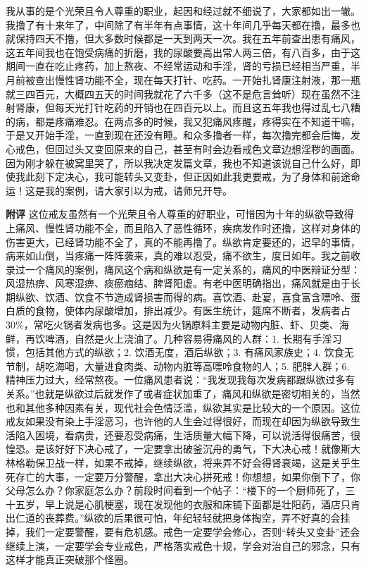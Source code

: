 \begin{case}
    我从事的是个光荣且令人尊重的职业，起因和经过就不细说了，大家都如出一辙。我撸了有十来年了，中间除了有半年有点事情，这十年间几乎每天都在撸，最多也就保持四天不撸，但大多数时候都是一天到两天一次。我在五年前查出患有痛风，这五年间我也在饱受病痛的折磨，我的尿酸要高出常人两三倍，有八百多，由于这期间一直在吃止疼药，加上熬夜、不经常运动和手淫，肾的亏损已经相当严重，半月前被查出慢性肾功能不全，现在每天打针、吃药。一开始扎肾康注射液，那一瓶就三四百元，大概四五天的时间我就花了六千多（这不是危言耸听）现在虽然不注射肾康，但每天光打针吃药的开销也在四百元以上。而且这五年我也得过乱七八糟的病，都是疼痛难忍。在两点多的时候，我又犯痛风疼醒，疼得实在不知道干嘛，于是又开始手淫，一直到现在还没有睡。和众多撸者一样，每次撸完都会后悔，发心戒色，但回过头又变回原来的自己，甚至有时会边看戒色文章边想淫秽的画面。因为刚才躲在被窝里哭了，所以我决定发篇文章，我也不知道该说自己什么好，即使我此刻下定决心，我可能转头又变卦，但正因如此我更要戒，为了身体和前途命运！这是我的案例，请大家引以为戒，请师兄开导。

    \textbf{附评} 这位戒友虽然有一个光荣且令人尊重的好职业，可惜因为十年的纵欲导致得上痛风、慢性肾功能不全，而且陷入了恶性循环，疾病发作时还撸，这样对身体的伤害更大，已经肾功能不全了，真的不能再撸了。纵欲肯定要还的，迟早的事情，病来如山倒，当疼痛一阵阵袭来，真的难以忍受，痛不欲生，度日如年。我之前收录过一个痛风的案例，痛风这个病和纵欲是有一定关系的，痛风的中医辩证分型：风湿热痹、风寒湿痹、痰瘀痼结、脾肾阳虚。有老中医明确指出，痛风就是由于长期纵欲、饮酒、饮食不节造成肾损害而得的病。喜饮酒、赴宴，喜食富含嘌呤、蛋白质的食物，使体内尿酸增加，排出减少。有医生统计，筵席不断者，发病者占 30\%，常吃火锅者发病也多。这是因为火锅原料主要是动物内脏、虾、贝类、海鲜，再饮啤酒，自然是火上浇油了。几种容易得痛风的人群：1. 长期有手淫习惯，包括其他方式的纵欲；2. 饮酒无度，酒后纵欲；3. 有痛风家族史；4. 饮食无节制，胡吃海喝，大量进食肉类、动物内脏等高嘌呤食物的人；5. 肥胖人群；6. 精神压力过大，经常熬夜。一位痛风患者说：“我发现我每次发病都跟纵欲过多有关系。”也就是纵欲过后就发作了或者症状加重了，痛风和纵欲是密切相关的，当然也和其他多种因素有关，现代社会色情泛滥，纵欲其实是比较大的一个原因。这位戒友如果没有染上手淫恶习，也许他的人生会过得很好，而现在却因为纵欲导致生活陷入困境，看病贵，还要忍受病痛，生活质量大幅下降，可以说活得很痛苦，很惶恐。是该好好下决心戒了，一定要拿出破釜沉舟的勇气，下大决心戒！就像斯大林格勒保卫战一样，如果不戒掉，继续纵欲，将来弄不好会得肾衰竭，这是关乎生死存亡的大事，一定要万分警醒，拿出大决心拼死戒！你想想，如果你倒下了，你父母怎么办？你家庭怎么办？前段时间看到一个帖子：“楼下的一个厨师死了，三十五岁，早上说是心肌梗塞，现在发现他的衣服和床铺下面都是壮阳药，酒店只肯出仁道的丧葬费。”纵欲的后果很可怕，年纪轻轻就把身体掏空，弄不好真的会挂掉，我们一定要警醒，要有危机感。戒色一定要学会修心，否则“转头又变卦”还会继续上演，一定要学会专业戒色，严格落实戒色十规，学会对治自己的邪念，只有这样才能真正突破那个怪圈。
\end{case}


